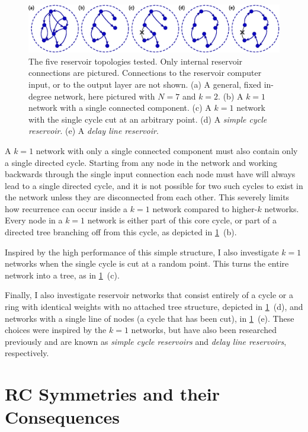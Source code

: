 \begin{figure}
  \includegraphics[width=\textwidth]{figures/topology}
  \caption{The five reservoir topologies tested. Only internal
    reservoir connections are pictured. Connections to the reservoir
    computer input, or to the output layer are not shown. (a) A
    general, fixed in-degree network, here pictured with $N=7$ and
    $k=2$. (b) A $k=1$ network with a single connected component. (c)
    A $k=1$ network with the single cycle cut at an arbitrary
    point. (d) A \emph{simple cycle reservoir}. (e) A \emph{delay line
      reservoir}.}%
  \label{fig:topology}
\end{figure}

A $k = 1$ network with only a single connected component must also
contain only a single directed cycle. Starting from any node in the
network and working backwards through the single input connection each
node must have will always lead to a single directed cycle, and it is
not possible for two such cycles to exist in the network unless they
are disconnected from each other. This severely limits how recurrence
can occur inside a $k = 1$ network compared to higher-$k$
networks. Every node in a $k = 1$ network is either part of this core
cycle, or part of a directed tree branching off from this cycle, as
depicted in \cref{fig:topology}~(b).

Inspired by the high performance of this simple structure, I also
investigate $k = 1$ networks when the single cycle is cut at a random
point. This turns the entire network into a tree, as in
\cref{fig:topology}~(c).

Finally, I also investigate reservoir networks that consist entirely
of a cycle or a ring with identical weights with no attached tree
structure, depicted in \cref{fig:topology}~(d), and networks with a
single line of nodes (a cycle that has been cut), in
\cref{fig:topology}~(e). These choices were inspired by the $k = 1$
networks, but have also been researched previously and are known as
\emph{simple cycle reservoirs} and \emph{delay line reservoirs},
respectively.\cite{rodan2011}

\section{RC Symmetries and their Consequences}

